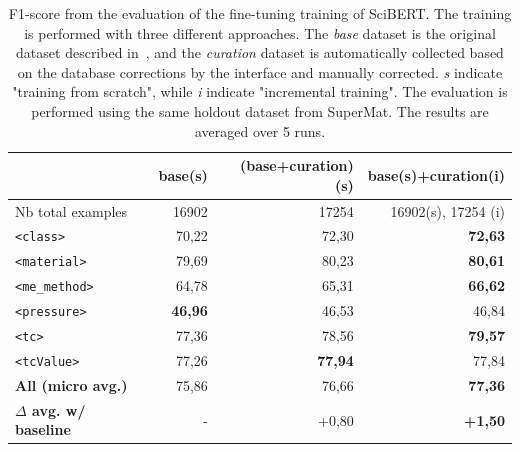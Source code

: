 \documentclass[a4paper]{article}
\begin{document}
\begin{table}[ht]
\centering\small
\caption{F1-score from the evaluation of the fine-tuning training of SciBERT. The training is performed with three different approaches. 
The \emph{base} dataset is the original dataset described in~\cite{lfoppiano2023automatic}, and the \emph{curation} dataset is automatically collected based on the database corrections by the interface and manually corrected. \textit{s} indicate "training from scratch", while \textit{i} indicate "incremental training". 
The evaluation is performed using the same holdout dataset from SuperMat. 
The results are averaged over 5 runs. }
\begin{tabular}{lrrr}
\toprule
& \textbf{base}(s) & \textbf{(base+curation)(s)} & \textbf{base(s)+curation(i)} \\ 
\midrule
Nb total examples & 16902 & 17254 & 16902(s), 17254 (i)\\ 
\midrule
\texttt{<class>}        & 70,22             & 72,30             & \textbf{72,63} \\ 
\texttt{<material>}     & 79,69             & 80,23             & \textbf{80,61} \\ 
\texttt{<me\_method>}   & 64,78             & 65,31             & \textbf{66,62} \\ 
\texttt{<pressure>}     & \textbf{46,96}    & 46,53             & 46,84 \\ 
\texttt{<tc>}           & 77,36             & 78,56             & \textbf{79,57} \\ 
\texttt{<tcValue>}      & 77,26             & \textbf{77,94}    & 77,84 \\ 
\midrule
\textbf{All (micro avg.)} & 75,86           & 76,66             & \textbf{77,36} \\ 
\midrule
\textbf{$\Delta$ avg. w/ baseline}& -   & +0,80             & \textbf{+1,50} \\ 
\bottomrule
\end{tabular}
\label{tab:evaluation-curation-training}
\end{table}
\end{document}
